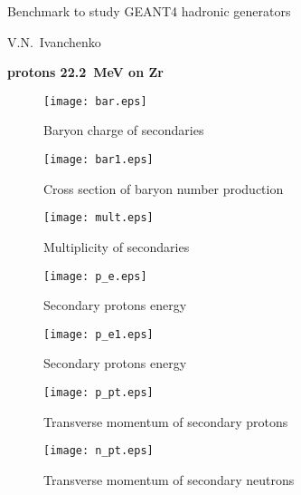 \documentclass[12pt]{article}
\begin{document}
\pagestyle{empty}

\begin{center}
{\large Benchmark to study GEANT4 hadronic generators} 

\vspace*{5mm}
V.N.~Ivanchenko

\vspace*{5mm}


\vspace*{5mm}

{\bf protons 22.2~MeV on Zr} 

\vspace*{5mm}


\end{center}


\begin{figure}[htbp]
\caption{Baryon charge of secondaries}
\label{fig1}  
\centerline{\texttt{[image: bar.eps]}}
\end{figure}

\begin{figure}[htbp]
\caption{Cross section of baryon number production}
\label{fig1b}  
\centerline{\texttt{[image: bar1.eps]}}
\end{figure}

\begin{figure}[htbp]
\caption{Multiplicity of secondaries}
\label{fig1a}  
\centerline{\texttt{[image: mult.eps]}}
\end{figure}
\begin{figure}[htbp]
\caption{Secondary protons energy}
\label{fig2} 
\centerline{\texttt{[image: p\_e.eps]}}
\end{figure}
\begin{figure}[htbp]
\caption{Secondary protons energy}
\label{fig2a} 
\centerline{\texttt{[image: p\_e1.eps]}}
\end{figure}

\newpage

\begin{figure}[htbp]
\caption{Transverse momentum of secondary protons} 
\label{fig3}
\centerline{\texttt{[image: p\_pt.eps]}}
\end{figure}

\newpage

\begin{figure}[htbp]
\caption{Transverse momentum of secondary neutrons} 
\label{fig4}
\centerline{\texttt{[image: n\_pt.eps]}}
\end{figure}
\end{document}
